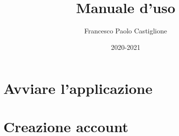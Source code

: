 \documentclass{article}
\title{Manuale d'uso}
\author{Francesco Paolo Castiglione}
\date{2020-2021}
\begin{document}
\maketitle

\tableofcontents

\section{Avviare l'applicazione}

\section{Creazione account}
\end{document}
